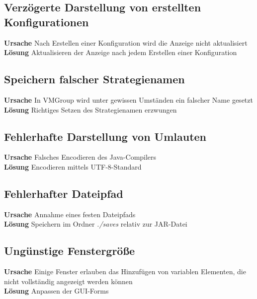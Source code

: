 \subsection{Verzögerte Darstellung von erstellten Konfigurationen}

\textbf{Ursache} Nach Erstellen einer Konfiguration wird die Anzeige nicht aktualisiert\\
\textbf{Lösung} Aktualisieren der Anzeige nach jedem Erstellen einer Konfiguration

\subsection{Speichern falscher Strategienamen}

\textbf{Ursache} In VMGroup wird unter gewissen Umständen ein falscher Name gesetzt\\
\textbf{Lösung} Richtiges Setzen des Strategienamen erzwungen

\subsection{Fehlerhafte Darstellung von Umlauten}

\textbf{Ursache} Falsches Encodieren des Java-Compilers\\
\textbf{Lösung} Encodieren mittels UTF-8-Standard

\subsection{Fehlerhafter Dateipfad}

\textbf{Ursache} Annahme eines festen Dateipfads\\
\textbf{Lösung} Speichern im Ordner \emph{./saves} relativ zur JAR-Datei

\subsection{Ungünstige Fenstergröße}

\textbf{Ursache} Einige Fenster erlauben das Hinzufügen von variablen Elementen, die nicht vollständig angezeigt werden können\\
\textbf{Lösung} Anpassen der GUI-Forms

